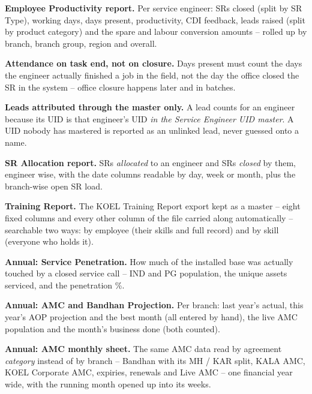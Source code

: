 \documentclass[11pt,a4paper]{article}
\begin{document}
\begin{reqlist}
\item \textbf{Employee Productivity report.} Per service engineer: SRs closed (split by SR
Type), working days, days present, productivity, CDI feedback, leads raised (split by
product category) and the spare and labour conversion amounts -- rolled up by branch,
branch group, region and overall.

\item \textbf{Attendance on task end, not on closure.} Days present must count the days
the engineer actually finished a job in the field, not the day the office closed the SR
in the system -- office closure happens later and in batches.

\item \textbf{Leads attributed through the master only.} A lead counts for an engineer
because its UID is that engineer's UID \emph{in the Service Engineer UID master}. A UID
nobody has mastered is reported as an unlinked lead, never guessed onto a name.

\item \textbf{SR Allocation report.} SRs \emph{allocated} to an engineer and SRs
\emph{closed} by them, engineer wise, with the date columns readable by day, week or
month, plus the branch-wise open SR load.

\item \textbf{Training Report.} The KOEL Training Report export kept as a master --
eight fixed columns and every other column of the file carried along automatically --
searchable two ways: by employee (their skills and full record) and by skill (everyone
who holds it).

\item \textbf{Annual: Service Penetration.} How much of the installed base was actually
touched by a closed service call -- IND and PG population, the unique assets serviced,
and the penetration \%.

\item \textbf{Annual: AMC and Bandhan Projection.} Per branch: last year's actual, this
year's AOP projection and the best month (all entered by hand), the live AMC population
and the month's business done (both counted).

\item \textbf{Annual: AMC monthly sheet.} The same AMC data read by agreement
\emph{category} instead of by branch -- Bandhan with its MH / KAR split, KALA AMC, KOEL
Corporate AMC, expiries, renewals and Live AMC -- one financial year wide, with the
running month opened up into its weeks.


\end{reqlist}
\end{document}
